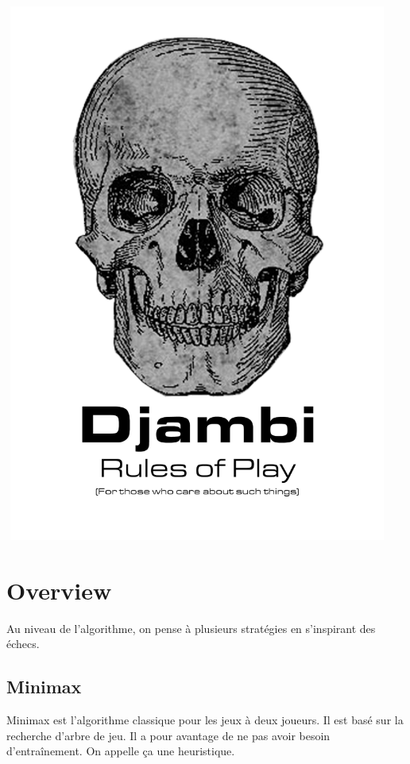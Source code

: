 \documentclass{article}
\begin{document}
\includegraphics[width=5in,height=7in]{media/image1.png}
\newpage

\tableofcontents

\newpage

\section{Overview}

Au niveau de l'algorithme, on pense à plusieurs stratégies en s'inspirant des échecs.

\subsection{Minimax}

Minimax est l'algorithme classique pour les jeux à deux joueurs. Il est basé sur la recherche d'arbre de jeu.
Il a pour avantage de ne pas avoir besoin d'entraînement. On appelle ça une heuristique.
\end{document}
